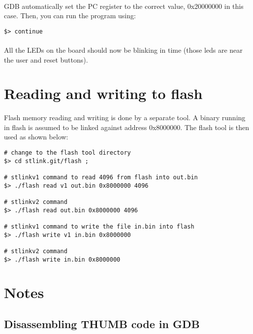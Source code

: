 \documentclass[a4paper, 11pt]{article}
\begin{document}
\paragraph{}
GDB automatically set the PC register to the correct value, 0x20000000 in this case. Then, you
can run the program using:\\
\begin{small}
\begin{lstlisting}[frame=tb]
$> continue
\end{lstlisting}
\end{small}

\paragraph{}
All the LEDs on the board should now be blinking in time (those leds are near the user and reset buttons).

\newpage
\section{Reading and writing to flash}
\paragraph{}
Flash memory reading and writing is done by a separate tool. A binary running in flash is assumed to
be linked against address 0x8000000. The flash tool is then used as shown below:\\
\begin{small}
\begin{lstlisting}[frame=tb]
# change to the flash tool directory
$> cd stlink.git/flash ;

# stlinkv1 command to read 4096 from flash into out.bin
$> ./flash read v1 out.bin 0x8000000 4096

# stlinkv2 command
$> ./flash read out.bin 0x8000000 4096

# stlinkv1 command to write the file in.bin into flash
$> ./flash write v1 in.bin 0x8000000

# stlinkv2 command
$> ./flash write in.bin 0x8000000
\end{lstlisting}
\end{small}


\newpage
\section{Notes}

\subsection{Disassembling THUMB code in GDB}
\end{document}
